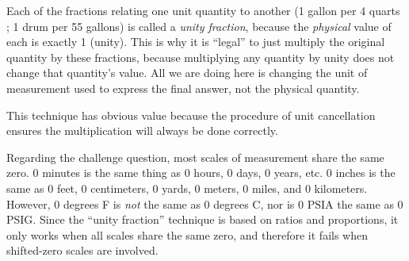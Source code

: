 





Each of the fractions relating one unit quantity to another (1 gallon per 4 quarts ; 1 drum per 55 gallons) is called a {\it unity fraction}, because the {\it physical} value of each is exactly 1 (unity).  This is why it is ``legal'' to just multiply the original quantity by these fractions, because multiplying any quantity by unity does not change that quantity's value.  All we are doing here is changing the unit of measurement used to express the final answer, not the physical quantity.

This technique has obvious value because the procedure of unit cancellation ensures the multiplication will always be done correctly.

\vskip 10pt

Regarding the challenge question, most scales of measurement share the same zero.  0 minutes is the same thing as 0 hours, 0 days, 0 years, etc.  0 inches is the same as 0 feet, 0 centimeters, 0 yards, 0 meters, 0 miles, and 0 kilometers.  However, 0 degrees F is {\it not} the same as 0 degrees C, nor is 0 PSIA the same as 0 PSIG.  Since the ``unity fraction'' technique is based on ratios and proportions, it only works when all scales share the same zero, and therefore it fails when shifted-zero scales are involved.




